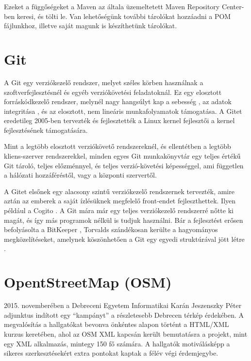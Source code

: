 \documentclass[a4paper,12pt]{report}
\begin{document}
\vspace{2mm}
Ezeket a függőségeket a Maven az általa üzemeltetett Maven Repository Center-ben \cite{mavenrepository} keresi, és tölti le. Van lehetőségünk további tárolókat hozzáadni a POM fájlunkhoz, illetve saját magunk is készíthetünk tárolókat.

\newpage
\section{Git}
\label{git}

A Git egy verziókezelő rendszer, melyet széles körben használnak a szoftverfejlesztésnél és egyéb verziókövetési feladatoknál. Ez egy elosztott forráskódkezelő rendszer, melynél nagy hangsúlyt kap a sebesség \cite{gitspeed}, az adatok integritása \cite{gitdata}, és az elosztott, nem lineáris munkafolyamatok támogatása. A Gitet eredetileg 2005-ben tervezték és fejlesztették a Linux kernel fejlesztői a kernel fejlesztésének támogatására.

\vspace{2mm}
Mint a legtöbb elosztott verziókövető rendszereknél, és ellentétben a legtöbb kliens-szerver rendszerekkel, minden egyes Git munkakönyvtár egy teljes értékű Git tároló, teljes előzménnyel, és teljes verzió-követési képességgel, ami független a hálózati hozzáféréstől, vagy a központi szervertől.

\vspace{2mm}
A Gitet elsőnek egy alacsony szintű verziókezelő rendszernek tervezték, amire aztán az emberek a saját ízlésüknek megfelelő front-endet fejleszthettek. Ilyen például a Cogito \cite{cogito}. A Git mára már egy teljes verziókezelő rendszerré nőtte ki magát, és így más programok nélkül is tudjuk használni. Bár a fejlesztést erősen befolyásolta a BitKeeper \cite{bitkeeper}, Torvalds szándékosan kerülte a hagyományos megközelítéseket, amelynek köszönhetően a Git egy egyedi struktúrával jött létre \cite{gitunique}.

\newpage
\section{OpentStreetMap (OSM)}
\label{osm}

\vspace{2mm}
2015. novemberében a Debreceni Egyetem Informatikai Karán Jeszenszky Péter adjunktus indított egy ``kampányt'' a részletesebb Debrecen térkép érdekében. A megvalósítás a hallgatókat bevonva önkéntes alapon történt a HTML/XML kurzus keretében, ahol az OSM XML kapcsán került bemutatásra a projekt, mint egy XML alkalmazás, mintegy 150 fő számára. A hallgatók motiválásképp a sikeres szerkesztésekért extra pontokat kaptak a félév végi érdemjegybe.
\end{document}
